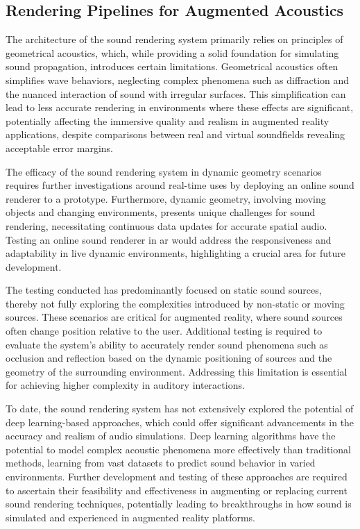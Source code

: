 \subsection{Rendering Pipelines for Augmented Acoustics}
The architecture of the sound rendering system primarily relies on principles of geometrical acoustics, which, while providing a solid foundation for simulating sound propagation, introduces certain limitations. Geometrical acoustics often simplifies wave behaviors, neglecting complex phenomena such as diffraction and the nuanced interaction of sound with irregular surfaces. This simplification can lead to less accurate rendering in environments where these effects are significant, potentially affecting the immersive quality and realism in augmented reality applications, despite comparisons between real and virtual soundfields revealing acceptable error margins.\par
The efficacy of the sound rendering system in dynamic geometry scenarios requires further investigations around real-time uses by deploying an online sound renderer to a prototype. Furthermore, dynamic geometry, involving moving objects and changing environments, presents unique challenges for sound rendering, necessitating continuous data updates for accurate spatial audio. Testing an online sound renderer in \acrshort{ar} would address the responsiveness and adaptability in live dynamic environments, highlighting a crucial area for future development.\par
The testing conducted has predominantly focused on static sound sources, thereby not fully exploring the complexities introduced by non-static or moving sources. These scenarios are critical for augmented reality, where sound sources often change position relative to the user. Additional testing is required to evaluate the system's ability to accurately render sound phenomena such as occlusion and reflection based on the dynamic positioning of sources and the geometry of the surrounding environment. Addressing this limitation is essential for achieving higher complexity in auditory interactions.\par
To date, the sound rendering system has not extensively explored the potential of deep learning-based approaches, which could offer significant advancements in the accuracy and realism of audio simulations. Deep learning algorithms have the potential to model complex acoustic phenomena more effectively than traditional methods, learning from vast datasets to predict sound behavior in varied environments. Further development and testing of these approaches are required to ascertain their feasibility and effectiveness in augmenting or replacing current sound rendering techniques, potentially leading to breakthroughs in how sound is simulated and experienced in augmented reality platforms.\par

